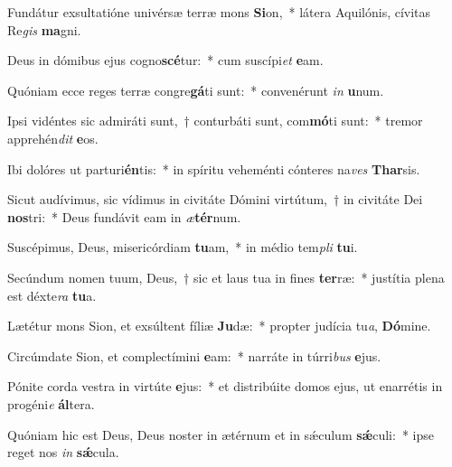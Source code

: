 \item Fundátur exsultatióne univérsæ terræ mons \textbf{Si}on,~* látera Aquilónis, cívitas Re\textit{gis} \textbf{ma}gni.
\item Deus in dómibus ejus cogno\textbf{scé}tur:~* cum suscípi\textit{et} \textbf{e}am.
\item Quóniam ecce reges terræ congre\textbf{gá}ti sunt:~* convenérunt \textit{in} \textbf{u}num.
\item Ipsi vidéntes sic admiráti sunt,~† conturbáti sunt, com\textbf{mó}ti sunt:~* tremor apprehén\textit{dit} \textbf{e}os.
\item Ibi dolóres ut parturi\textbf{én}tis:~* in spíritu veheménti cónteres na\textit{ves} \textbf{Thar}sis.
\item Sicut audívimus, sic vídimus in civitáte Dómini virtútum,~† in civitáte Dei \textbf{nos}tri:~* Deus fundávit eam in \textit{æ}\textbf{tér}num.
\item Suscépimus, Deus, misericórdiam \textbf{tu}am,~* in médio tem\textit{pli} \textbf{tu}i.
\item Secúndum nomen tuum, Deus,~† sic et laus tua in fines \textbf{ter}ræ:~* justítia plena est déxte\textit{ra} \textbf{tu}a.
\item Lætétur mons Sion, et exsúltent fíliæ \textbf{Ju}dæ:~* propter judícia tu\textit{a}, \textbf{Dó}mine.
\item Circúmdate Sion, et complectímini \textbf{e}am:~* narráte in túrri\textit{bus} \textbf{e}jus.
\item Pónite corda vestra in virtúte \textbf{e}jus:~* et distribúite domos ejus, ut enarrétis in progéni\textit{e} \textbf{ál}tera.
\item Quóniam hic est Deus, Deus noster in ætérnum et in sǽculum \textbf{sǽ}culi:~* ipse reget nos \textit{in} \textbf{sǽ}cula.
